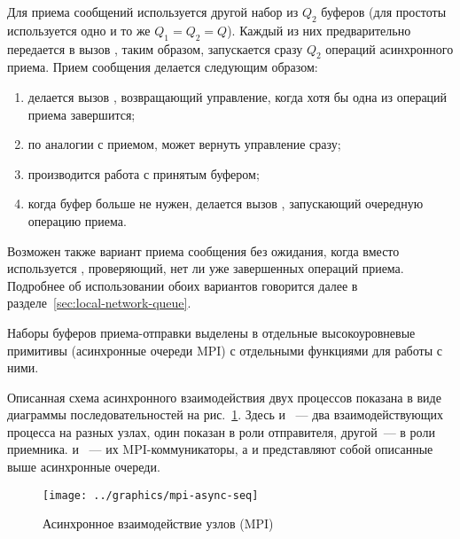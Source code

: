 Для приема сообщений используется другой набор из $Q_2$ буферов (для простоты используется
одно и то же $Q_1 = Q_2 = Q$). Каждый из них предварительно передается в вызов
, таким образом, запускается сразу $Q_2$ операций асинхронного приема. Прием
сообщения делается следующим образом:
\begin{enumerate}
\item делается вызов , возвращающий управление, когда хотя бы одна из
  операций приема завершится;
\item по аналогии с приемом,  может вернуть управление сразу;
\item производится работа с принятым буфером;
\item когда буфер больше не нужен, делается вызов , запускающий очередную
  операцию приема.
\end{enumerate}

Возможен также вариант приема сообщения без ожидания, когда вместо 
используется , проверяющий, нет ли уже завершенных операций
приема. Подробнее об использовании обоих вариантов говорится далее в
разделе~\ref{sec:local-network-queue}.

Наборы буферов приема-отправки выделены в отдельные высокоуровневые примитивы (асинхронные
очереди MPI) с отдельными функциями для работы с ними.

Описанная схема асинхронного взаимодействия двух процессов показана в виде диаграммы
последовательностей на рис.~\ref{fig:mpi-async-seq}. Здесь  и ~--- два
взаимодействующих процесса на разных узлах, один показан в роли отправителя, другой~--- в
роли приемника.  и ~--- их MPI-коммуникаторы, а  и 
представляют собой описанные выше асинхронные очереди.

\begin{figure}[ht]
  \centering
  \texttt{[image: ../graphics/mpi-async-seq]}  
  \caption{Асинхронное взаимодействие узлов (MPI)}
  \label{fig:mpi-async-seq}
\end{figure}



